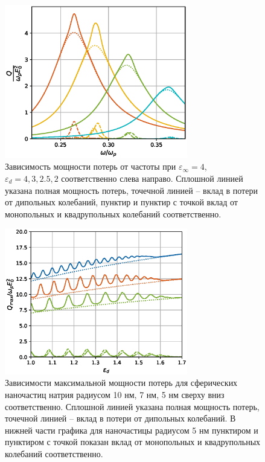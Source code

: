 \documentclass[12pt, a4paper]{article}
\def \eps {\varepsilon}
\begin{document}
\begin{figure}[h]
	\centering
	\includegraphics[width=80mm]{./image/fig1_epsd4.eps}
	\caption{Зависимость мощности потерь от частоты при $\eps_\infty= 4$, $\eps_d = 4, 3, 2.5, 2$ соответственно слева направо. Сплошной линией указана полная мощность потерь, точечной линией – вклад в потери от дипольных колебаний, пунктир и пунктир с точкой вклад от монопольных и квадрупольных колебаний соответственно. }
	\label{fig1_epsd4}
\end{figure} 
\newpage
\begin{figure}[h]
	\centering
	\includegraphics[width=80mm]{./image/natr2.eps}
	\caption{Зависимости максимальной мощности потерь для сферических наночастиц натрия радиусом 10 нм, 7 нм, 5 нм сверху вниз соответственно. Сплошной линией указана полная мощность потерь, точечной линией – вклад в потери от дипольных колебаний. В нижней части графика для наночастицы радиусом 5 нм пунктиром и пунктиром с точкой показан вклад от монопольных и квадрупольных колебаний соответственно.}
	\label{natr}
\end{figure} 
\end{document}
